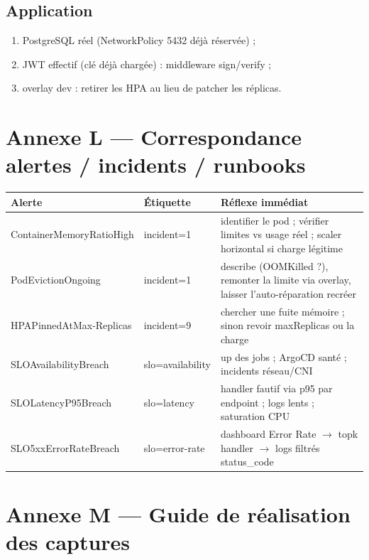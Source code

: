 \documentclass[12pt,a4paper]{article}
\begin{document}
\subsection*{Application}
\begin{enumerate}[itemsep=1pt]
  \item PostgreSQL réel (NetworkPolicy 5432 déjà réservée) ;
  \item JWT effectif (clé déjà chargée) : middleware sign/verify ;
  \item overlay dev : retirer les HPA au lieu de patcher les réplicas.
\end{enumerate}

\section*{Annexe L --- Correspondance alertes / incidents / runbooks}

\begin{longtable}{@{}p{4.4cm}p{2.6cm}p{7.0cm}@{}}
\toprule
\textbf{Alerte} & \textbf{Étiquette} & \textbf{Réflexe immédiat} \\
\midrule
\endhead
ContainerMemoryRatio\newline High & incident=1 & identifier le pod ; vérifier limites vs usage réel ; scaler horizontal si charge légitime \\
PodEvictionOngoing & incident=1 & describe (OOMKilled ?), remonter la limite via overlay, laisser l'auto-réparation recréer \\
HPAPinnedAtMax-\newline Replicas & incident=9 & chercher une fuite mémoire ; sinon revoir maxReplicas ou la charge \\
SLOAvailabilityBreach & slo=availability & up des jobs ; ArgoCD santé ; incidents réseau/CNI \\
SLOLatencyP95Breach & slo=latency & handler fautif via p95 par endpoint ; logs lents ; saturation CPU \\
SLO5xxErrorRateBreach & slo=error-rate & dashboard Error Rate $\rightarrow$ topk handler $\rightarrow$ logs filtrés status\_code \\
\bottomrule
\end{longtable}

\section*{Annexe M --- Guide de réalisation des captures}
\end{document}

